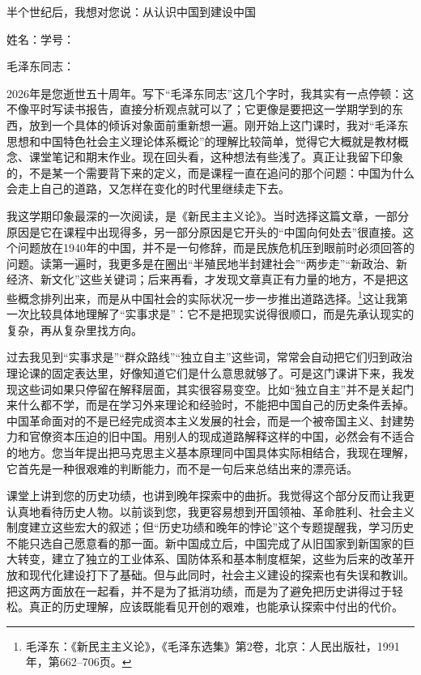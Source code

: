 \documentclass[12pt,a4paper]{ctexart}
\begin{document}
\begin{center}
    {\heiti 半个世纪后，我想对您说：从认识中国到建设中国\par}
    \vspace{0.8em}
    {\kaishu 姓名：\underline{\hspace{3.5cm}}\qquad 学号：\underline{\hspace{4cm}}\par}
\end{center}

\vspace{1em}

{\songti\setlength{\baselineskip}{20pt}\selectfont

毛泽东同志：

2026年是您逝世五十周年。写下“毛泽东同志”这几个字时，我其实有一点停顿：这不像平时写读书报告，直接分析观点就可以了；它更像是要把这一学期学到的东西，放到一个具体的倾诉对象面前重新想一遍。刚开始上这门课时，我对“毛泽东思想和中国特色社会主义理论体系概论”的理解比较简单，觉得它大概就是教材概念、课堂笔记和期末作业。现在回头看，这种想法有些浅了。真正让我留下印象的，不是某一个需要背下来的定义，而是课程一直在追问的那个问题：中国为什么会走上自己的道路，又怎样在变化的时代里继续走下去。

我这学期印象最深的一次阅读，是《新民主主义论》。当时选择这篇文章，一部分原因是它在课程中出现得多，另一部分原因是它开头的“中国向何处去”很直接。这个问题放在1940年的中国，并不是一句修辞，而是民族危机压到眼前时必须回答的问题。读第一遍时，我更多是在圈出“半殖民地半封建社会”“两步走”“新政治、新经济、新文化”这些关键词；后来再看，才发现文章真正有力量的地方，不是把这些概念排列出来，而是从中国社会的实际状况一步一步推出道路选择。\footnote{毛泽东：《新民主主义论》，《毛泽东选集》第2卷，北京：人民出版社，1991年，第662--706页。}这让我第一次比较具体地理解了“实事求是”：它不是把现实说得很顺口，而是先承认现实的复杂，再从复杂里找方向。

过去我见到“实事求是”“群众路线”“独立自主”这些词，常常会自动把它们归到政治理论课的固定表达里，好像知道它们是什么意思就够了。可是这门课讲下来，我发现这些词如果只停留在解释层面，其实很容易变空。比如“独立自主”并不是关起门来什么都不学，而是在学习外来理论和经验时，不能把中国自己的历史条件丢掉。中国革命面对的不是已经完成资本主义发展的社会，而是一个被帝国主义、封建势力和官僚资本压迫的旧中国。用别人的现成道路解释这样的中国，必然会有不适合的地方。您当年提出把马克思主义基本原理同中国具体实际相结合，我现在理解，它首先是一种很艰难的判断能力，而不是一句后来总结出来的漂亮话。

课堂上讲到您的历史功绩，也讲到晚年探索中的曲折。我觉得这个部分反而让我更认真地看待历史人物。以前谈到您，我更容易想到开国领袖、革命胜利、社会主义制度建立这些宏大的叙述；但“历史功绩和晚年的悖论”这个专题提醒我，学习历史不能只选自己愿意看的那一面。新中国成立后，中国完成了从旧国家到新国家的巨大转变，建立了独立的工业体系、国防体系和基本制度框架，这些为后来的改革开放和现代化建设打下了基础。但与此同时，社会主义建设的探索也有失误和教训。把这两方面放在一起看，并不是为了抵消功绩，而是为了避免把历史讲得过于轻松。真正的历史理解，应该既能看见开创的艰难，也能承认探索中付出的代价。

}
\end{document}
